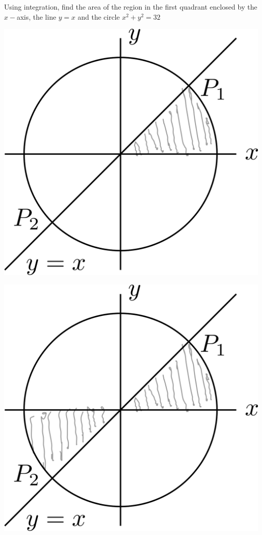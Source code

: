 \documentclass[14pt,fleqn]{extarticle}
\begin{document}
Using integration, find the area of the region in the first quadrant 
enclosed by the $x-$axis, the line $y=x$ and the circle $x^2+y^2 = 32$

\newcard

\begin{center}
\includegraphics[scale=0.3]{img_1-right.svg}
\end{center}

\newcard

\begin{center}
\includegraphics[scale=0.3]{img_1-wrong.svg}
\end{center}
\end{document}
